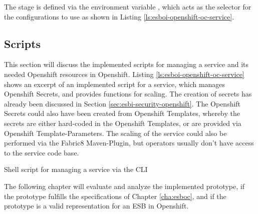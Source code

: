 The stage is defined via the environment variable , which acts as the selector for the configurations to use as shown in Listing \vref{ls:esboi-openshift-oc-service}.

\subsection{Scripts}
\label{sec:esbi-openshift-secrets}
This section will discuss the implemented scripts for managing a service and its needed Openshift resources in Openshift. Listing \vref{ls:esboi-openshift-oc-service} shows an excerpt of an implemented script for a service, which manages Openshift Secrets, and provides functions for scaling. The creation of secrets has already been discussed in Section \vref{sec:esbi-security-openshift}. The Openshift Secrets could also have been created from Openshift Templates, whereby the secrets are either hard-coded in the Openshift Templates, or are provided via Openshift Template-Parameters. The scaling of the service could also be performed via the Fabric8 Maven-Plugin, but operators usually don't have access to the service code base.

\begin{listing}[h]
	\caption{Shell script for managing a service via the CLI}
	\label{ls:esboi-openshift-oc-service}
\end{listing}

The following chapter will evaluate and analyze the implemented prototype, if the prototype fulfills the specifications of Chapter \vref{cha:esboc}, and if the prototype is a valid representation for an ESB in Openshift.


